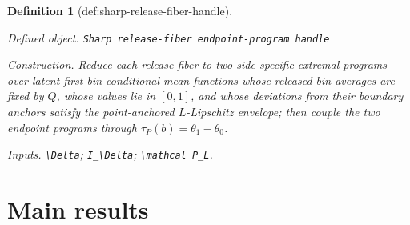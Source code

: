 \documentclass{article}
\newtheorem{definition}{Definition}
\begin{document}
\begin{definition}[def:sharp-release-fiber-handle]\label{def:sharp-release-fiber-handle}
\par\smallskip\noindent\emph{Defined object.} \texttt{Sharp release-\allowbreak{}fiber endpoint-\allowbreak{}program handle}
\par\smallskip\noindent\emph{Construction.} Reduce each release fiber to two side-specific extremal programs over latent first-bin conditional-mean functions whose released bin averages are fixed by \(Q\), whose values lie in \([0,1]\), and whose deviations from their boundary anchors satisfy the point-anchored \(L\)-Lipschitz envelope; then couple the two endpoint programs through \(\tau_P(b)=\theta_1-\theta_0\).
\par\smallskip\noindent\emph{Inputs.} \texttt{\textbackslash{}\allowbreak{}Delta}; \texttt{I\_\allowbreak{}\textbackslash{}\allowbreak{}Delta}; \texttt{\textbackslash{}\allowbreak{}mathcal P\_\allowbreak{}L}.
\end{definition}

\section{Main results}
\end{document}

